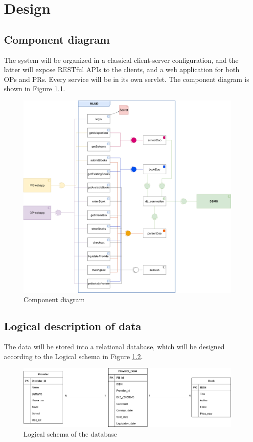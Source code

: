 \chapter{Design}

\section{Component diagram}

The system will be organized in a classical client-server configuration, and the latter will expose RESTful APIs to the clients, and a web application for both OPs and PRs. Every service will be in its own servlet. The component diagram is shown in Figure \ref{fig:component}.

\begin{figure}[H]
    \centering
    \includegraphics[width=.9\textwidth]{assets/component_diagram.png}
    \caption{Component diagram}
    \label{fig:component}
\end{figure}

\section{Logical description of data}

The data will be stored into a relational database, which will be designed according to the Logical schema in Figure \ref{fig:er}.

\begin{figure}[h]
    \centering
    \includegraphics[width=\textwidth]{assets/er_diagram.png}
    \caption{Logical schema of the database}
    \label{fig:er}
\end{figure}

